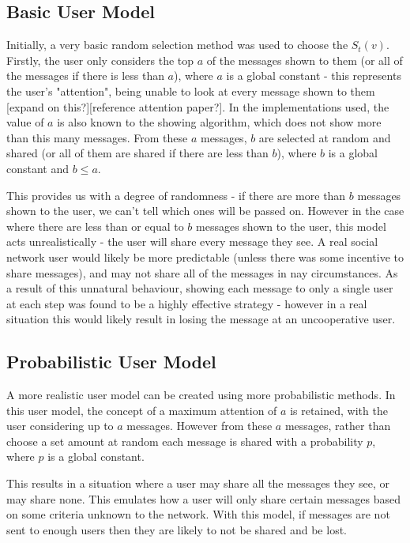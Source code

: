 \documentclass[bsc,frontabs,twoside,singlespacing,parskip,deptreport]{infthesis}     %
\begin{document}
\subsection{Basic User Model}
Initially, a very basic random selection method was used to choose the $S_{t}(v)$. Firstly, the user only considers the top $a$ of the messages shown to them (or all of the messages if there is less than $a$), where $a$ is a global constant - this represents the user's "attention", being unable to look at every message shown to them [expand on this?][reference attention paper?]. In the implementations used, the value of $a$ is also known to the showing algorithm, which does not show more than this many messages. From these $a$ messages, $b$ are selected at random and shared (or all of them are shared if there are less than $b$), where $b$ is a global constant and $b \le a$.

This provides us with a degree of randomness - if there are more than $b$ messages shown to the user, we can't tell which ones will be passed on. However in the case where there are less than or equal to $b$ messages shown to the user, this model acts unrealistically - the user will share every message they see. A real social network user would likely be more predictable (unless there was some incentive to share messages), and may not share all of the messages in nay circumstances. As a result of this unnatural behaviour, showing each message to only a single user at each step was found to be a highly effective strategy - however in a real situation this would likely result in losing the message at an uncooperative user.

\subsection{Probabilistic User Model}
A more realistic user model can be created using more probabilistic methods. In this user model, the concept of a maximum attention of $a$ is retained, with the user considering up to $a$ messages. However from these $a$ messages, rather than choose a set amount at random each message is shared with a probability $p$, where $p$ is a global constant.

This results in a situation where a user may share all the messages they see, or may share none. This emulates how a user will only share certain messages based on some criteria unknown to the network. With this model, if messages are not sent to enough users then they are likely to not be shared and be lost.
\end{document}
